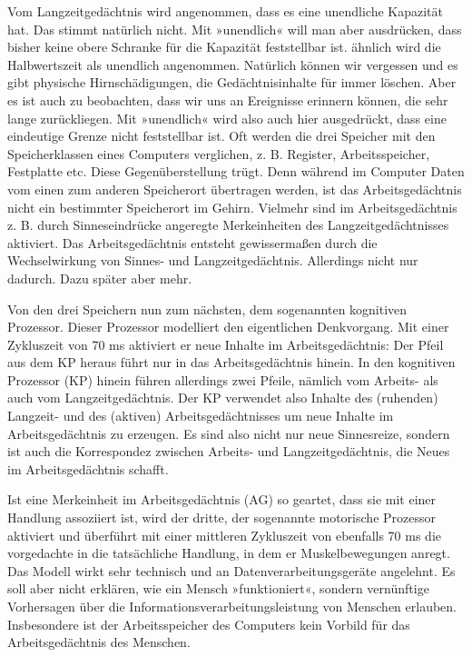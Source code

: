 \documentclass[paper=a4, fontsize=11pt]{scrartcl} %
\numberwithin{equation}{section} %
\numberwithin{figure}{section} %
\numberwithin{table}{section} %
\begin{document}
Vom Langzeitgedächtnis wird angenommen, dass es eine unendliche Kapazität hat. Das stimmt natürlich nicht. Mit »unendlich« will man aber ausdrücken, dass bisher keine obere Schranke für die Kapazität feststellbar ist.
ähnlich wird die Halbwertszeit als unendlich angenommen. Natürlich können wir vergessen und es gibt physische Hirnschädigungen, die Gedächtnisinhalte für immer löschen. Aber es ist auch zu beobachten, dass wir uns an Ereignisse erinnern können, die sehr lange zurückliegen. Mit »unendlich« wird also auch hier ausgedrückt, dass eine eindeutige Grenze nicht feststellbar ist.
Oft werden die drei Speicher mit den Speicherklassen eines Computers verglichen, z. B. Register, Arbeitsspeicher, Festplatte etc. Diese Gegenüberstellung trügt. Denn während im Computer Daten vom einen zum anderen Speicherort übertragen werden, ist das Arbeitsgedächtnis nicht ein bestimmter Speicherort im Gehirn. Vielmehr sind im Arbeitsgedächtnis z. B. durch Sinneseindrücke angeregte Merkeinheiten des Langzeitgedächtnisses aktiviert. Das Arbeitsgedächtnis entsteht gewissermaßen durch die Wechselwirkung von Sinnes- und Langzeitgedächtnis. Allerdings nicht nur dadurch. Dazu später aber mehr.

Von den drei Speichern nun zum nächsten, dem sogenannten kognitiven Prozessor. Dieser Prozessor modelliert den eigentlichen Denkvorgang. Mit einer Zykluszeit von 70 ms aktiviert er neue Inhalte im Arbeitsgedächtnis: Der Pfeil aus dem KP heraus führt nur in das Arbeitsgedächtnis hinein.
In den kognitiven Prozessor (KP) hinein führen allerdings zwei Pfeile, nämlich vom Arbeits- als auch vom Langzeitgedächtnis. Der KP verwendet also Inhalte des (ruhenden) Langzeit- und des (aktiven) Arbeitsgedächtnisses um neue Inhalte im Arbeitsgedächtnis zu erzeugen. Es sind also nicht nur neue Sinnesreize, sondern ist auch die Korrespondez zwischen Arbeits- und Langzeitgedächtnis, die Neues im Arbeitsgedächtnis schafft.

Ist eine Merkeinheit im Arbeitsgedächtnis (AG) so geartet, dass sie mit einer Handlung assoziiert ist, wird der dritte, der sogenannte motorische Prozessor aktiviert und überführt mit einer mittleren Zykluszeit von ebenfalls 70 ms die vorgedachte in die tatsächliche Handlung, in dem er Muskelbewegungen anregt.
Das Modell wirkt sehr technisch und an Datenverarbeitungsgeräte angelehnt. Es soll aber nicht erklären, wie ein Mensch »funktioniert«, sondern vernünftige Vorhersagen über die Informationsverarbeitungsleistung von Menschen erlauben.
Insbesondere ist der Arbeitsspeicher des Computers kein Vorbild für das Arbeitsgedächtnis des Menschen.
\end{document}
